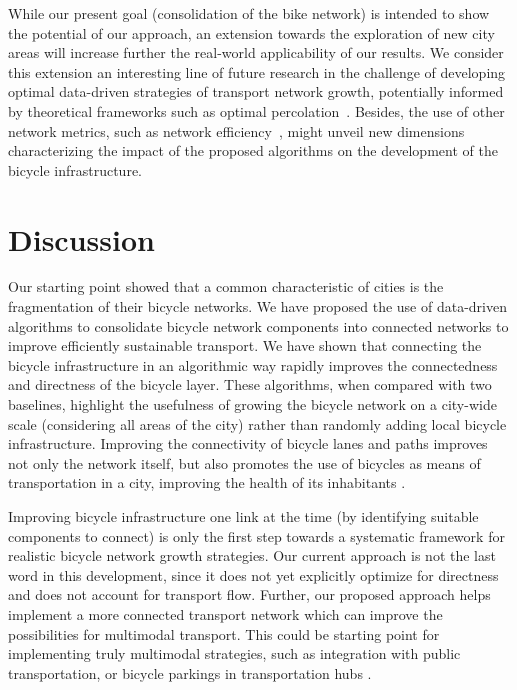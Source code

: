 While our present goal (consolidation of the bike network) is intended to show the potential of our approach, an extension towards the exploration of new city areas will increase further the real-world applicability of our results. We consider this extension an interesting line of future research in the challenge of developing optimal data-driven strategies of transport network growth, potentially informed by theoretical frameworks such as optimal percolation~\cite{achlioptas2009explosive,morone2015influence}. Besides, the use of other network metrics, such as network efficiency~\cite{latora2001efficient}, might unveil new dimensions characterizing the impact of the proposed algorithms on the development of the bicycle infrastructure.


\section{Discussion}
Our starting point showed that a common characteristic of cities is the fragmentation of their bicycle networks. We have proposed the use of data-driven algorithms to consolidate bicycle network components into connected networks to improve efficiently sustainable transport. We have shown that connecting the bicycle infrastructure in an algorithmic way rapidly improves the connectedness and directness of the bicycle layer. These algorithms, when compared with two baselines, highlight the usefulness of growing the bicycle network on a city-wide scale (considering all areas of the city) rather than randomly adding local bicycle infrastructure. Improving the connectivity of bicycle lanes and paths improves not only the network itself, but also promotes the use of bicycles as means of transportation in a city, improving the health of its inhabitants \cite{Mueller2018Health}.

Improving bicycle infrastructure one link at the time (by identifying suitable components to connect) is only the first step towards a systematic framework for realistic bicycle network growth strategies. Our current approach is not the last word in this development, since it does not yet explicitly optimize for directness and does not account for transport flow. Further, our proposed approach helps implement a more connected transport network which can improve the possibilities for multimodal transport. This could be starting point for implementing truly multimodal strategies, such as integration with public transportation, or bicycle parkings in transportation hubs \cite{Twaddell2018Multimodal}.

